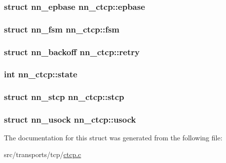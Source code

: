 \subsubsection[{epbase}]{\setlength{\rightskip}{0pt plus 5cm}struct {\bf nn\+\_\+epbase} nn\+\_\+ctcp\+::epbase}\hypertarget{structnn__ctcp_ab2ac5f22ebfcd925d3d9d3ecd89ec4bf}{}\label{structnn__ctcp_ab2ac5f22ebfcd925d3d9d3ecd89ec4bf}
\subsubsection[{fsm}]{\setlength{\rightskip}{0pt plus 5cm}struct {\bf nn\+\_\+fsm} nn\+\_\+ctcp\+::fsm}\hypertarget{structnn__ctcp_a718324121d9a84e33bf2d7dbd1f6a8d8}{}\label{structnn__ctcp_a718324121d9a84e33bf2d7dbd1f6a8d8}
\subsubsection[{retry}]{\setlength{\rightskip}{0pt plus 5cm}struct {\bf nn\+\_\+backoff} nn\+\_\+ctcp\+::retry}\hypertarget{structnn__ctcp_ac1b95bd51dafc4cd2cdd710759f5767b}{}\label{structnn__ctcp_ac1b95bd51dafc4cd2cdd710759f5767b}
\subsubsection[{state}]{\setlength{\rightskip}{0pt plus 5cm}int nn\+\_\+ctcp\+::state}\hypertarget{structnn__ctcp_a4f07e9462114b70bbcac159837dd08b9}{}\label{structnn__ctcp_a4f07e9462114b70bbcac159837dd08b9}
\subsubsection[{stcp}]{\setlength{\rightskip}{0pt plus 5cm}struct {\bf nn\+\_\+stcp} nn\+\_\+ctcp\+::stcp}\hypertarget{structnn__ctcp_ad3b1a0f3182b0ea30097b77d182c769e}{}\label{structnn__ctcp_ad3b1a0f3182b0ea30097b77d182c769e}
\subsubsection[{usock}]{\setlength{\rightskip}{0pt plus 5cm}struct {\bf nn\+\_\+usock} nn\+\_\+ctcp\+::usock}\hypertarget{structnn__ctcp_a4e614d0b4252d851f49c999b67d3fdc0}{}\label{structnn__ctcp_a4e614d0b4252d851f49c999b67d3fdc0}


The documentation for this struct was generated from the following file\+:\begin{DoxyCompactItemize}
\item 
src/transports/tcp/\hyperlink{ctcp_8c}{ctcp.\+c}\end{DoxyCompactItemize}
